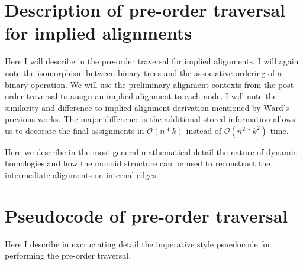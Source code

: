 \documentclass[11pt]{article}
\begin{document}
\section{Description of pre-order traversal for implied alignments}
Here I will describe in the pre-order traversal for implied alignments. I will again note the isomorphism between binary trees and the associative ordering of a binary operation. 
We will use the preliminary alignment contexts from the post order traversal to assign an implied alignment to each node. 
I will note the similarity and difference to implied alignment derivation mentioned by Ward's previous works. 
The major difference is the additional stored information allows us to decorate the final assignments in $\mathcal{O}(n*k)$ instead of $\mathcal{O}(n^2*k^2)$ time.

Here we describe in the most general mathematical detail the nature of dynamic homologies and how the monoid structure can be used to reconstruct the intermediate alignments on internal edges.


\section{Pseudocode of pre-order traversal}
Here I describe in excruciating detail the imperative style psuedocode for performing the pre-order traversal.
\end{document}

